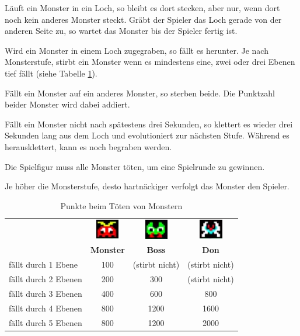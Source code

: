 \documentclass[12pt]{article}
\begin{document}
    Läuft ein Monster in ein Loch, so bleibt es dort stecken, aber nur, wenn dort noch kein anderes Monster steckt. Gräbt der Spieler das Loch gerade von der anderen Seite zu, so wartet das Monster bis der Spieler fertig ist.
    
    Wird ein Monster in einem Loch zugegraben, so fällt es herunter. Je nach Monsterstufe, stirbt ein Monster wenn es mindestens eine, zwei oder drei Ebenen tief fällt (siehe Tabelle \ref{table:monsterscores}).
    
    Fällt ein Monster auf ein anderes Monster, so sterben beide. Die Punktzahl beider Monster wird dabei addiert. 
    
    Fällt ein Monster nicht nach spätestens drei Sekunden, so klettert es wieder drei Sekunden lang aus dem Loch und evolutioniert zur nächsten Stufe. Während es herausklettert, kann es noch begraben werden.
    
    Die Spielfigur muss alle Monster töten, um eine Spielrunde zu gewinnen.
    
    Je höher die Monsterstufe, desto hartnäckiger verfolgt das Monster den Spieler.
    
\begin{table}[ht]
\centering
\begin{tabular}{c|ccc|}
\cline{2-4}
                                                     & \includegraphics{images/monster} & \includegraphics{images/boss} & \includegraphics{images/don} \\
\textbf{}                                            & \textbf{Monster} & \textbf{Boss} & \textbf{Don} \\ \hline
\multicolumn{1}{|l|}{fällt durch 1 Ebene}  & 100                        & (stirbt nicht)    & (stirbt nicht)   \\ \hline
\multicolumn{1}{|l|}{fällt durch 2 Ebenen} & 200                        & 300                     & (stirbt nicht)   \\ \hline
\multicolumn{1}{|l|}{fällt durch 3 Ebenen} & 400                        & 600                     & 800                    \\ \hline
\multicolumn{1}{|l|}{fällt durch 4 Ebenen} & 800                        & 1200                    & 1600                   \\ \hline
\multicolumn{1}{|l|}{fällt durch 5 Ebenen} & 800                        & 1200                    & 2000                   \\ \hline
\end{tabular}
\caption{Punkte beim Töten von Monstern}
\label{table:monsterscores}
\end{table}    
\end{document}
